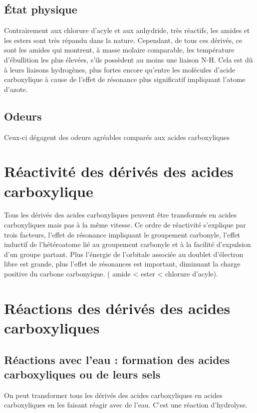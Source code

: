 \subsection{\'Etat physique}

Contrairement aux chlorure d'acyle et aux anhydride, très réactifs, les amides et les esters sont très répandu dans la nature.
Cependant, de tous ces dérivés, ce sont les amides qui montrent, à masse molaire comparable, les température d'ébullition les plus élevées, s'ils possèdent au moins une liaison N-H.
Cela est dû à leurs liaisons hydrogènes, plus fortes encore qu'entre les molécules d'acide carboxylique à cause de l'effet de résonance plus significatif impliquant l'atome d'azote.

\subsection{Odeurs}

Ceux-ci dégagent des odeurs agréables comparés aux acides carboxyliques



\section{Réactivité des dérivés des acides carboxylique}

Tous les dérivés des acides carboxyliques peuvent être transformés en acides carboxyliques mais pas à la même vitesse.
Ce ordre de réactivité s'explique par trois facteurs, l'effet de résonance impliquant le groupement carbonyle, l'effet inductif de l'hétéroatome lié au groupement carbonyle et à la facilité d'expulsion d'un groupe partant.
Plus l'énergie de l'orbitale associée au doublet d'électron libre est grande, plus l'effet de résonances est important, diminuant la charge positive du carbone carbonyique.
( amide < ester < chlorure d'acyle).

\section{Réactions des dérivés des acides carboxyliques}

\subsection{Réactions avec l'eau : formation des acides carboxyliques ou de leurs sels}

On peut transformer tous les dérivés des acides carboxyliques en acides carboxyliques en les faisant réagir avec de l'eau.
C'est une réaction d'hydrolyse.





